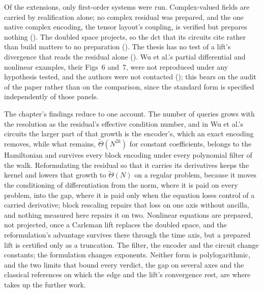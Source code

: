Of the extensions, only first-order systems were run. Complex-valued fields are carried by realification alone; no complex residual was prepared, and the one native complex encoding, the tensor layout's coupling, is verified but prepares nothing (). The doubled space projects, so the \gls{dct} that its circuits cite rather than build matters to no preparation (). The thesis has no test of a lift's divergence that reads the residual alone (). Wu et al.'s partial differential and nonlinear examples, their Figs~6 and~7, were not reproduced under any hypothesis tested, and the authors were not contacted (); this bears on the audit of the paper rather than on the comparison, since the standard form is specified independently of those panels.

The chapter's findings reduce to one account. The number of queries grows with the resolution as the residual's effective condition number, and in Wu et al.'s circuits the larger part of that growth is the encoder's, which an exact encoding removes, while what remains, $\tilde\Theta(N^{2k})$ for constant coefficients, belongs to the Hamiltonian and survives every block encoding under every polynomial filter of the walk. Reformulating the residual so that it carries its derivatives keeps the kernel and lowers that growth to $\tilde\Theta(N)$ on a regular problem, because it moves the conditioning of differentiation from the norm, where it is paid on every problem, into the gap, where it is paid only when the equation loses control of a carried derivative; block rescaling repairs that loss on one axis without ancilla, and nothing measured here repairs it on two. Nonlinear equations are prepared, not projected, once a Carleman lift replaces the doubled space, and the reformulation's advantage survives there through the time axis, but a prepared lift is certified only as a truncation. The filter, the encoder and the circuit change constants; the formulation changes exponents. Neither form is polylogarithmic, and the two limits that bound every verdict, the gap on several axes and the classical references on which the edge and the lift's convergence rest, are where  takes up the further work.
